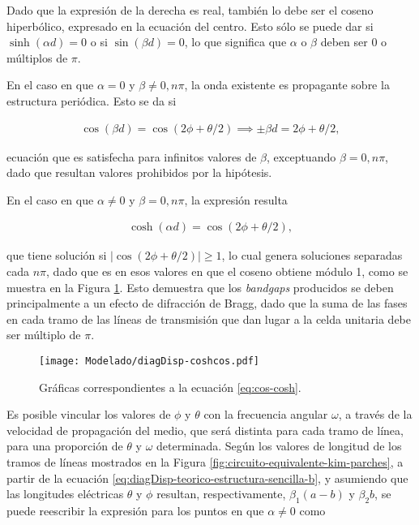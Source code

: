 Dado que la expresión de la derecha es real, también lo debe ser el coseno hiperbólico, expresado en la ecuación del centro. Esto sólo se puede dar si $\sinh(\alpha d) = 0$ o si $\sin(\beta d) = 0$, lo que significa que $\alpha$ o $\beta$ deben ser $0$ o múltiplos de $\pi$.

En el caso en que $\alpha = 0$ y $\beta \neq 0,n\pi$, la onda existente es propagante sobre la estructura periódica. Esto se da si

\begin{align}
	\label{eq:diagDisp-teorico-estructura-sencilla-b}
	\cos(\beta d) = \cos(2\phi + \theta/2) \implies \pm \beta d = 2\phi + \theta/2,
\end{align}

ecuación que es satisfecha para infinitos valores de $\beta$, exceptuando $\beta=0,n\pi$, dado que resultan valores prohibidos por la hipótesis.

En el caso en que $\alpha \neq 0$ y $\beta = 0,n\pi$, la expresión resulta

\begin{align}
\label{eq:cos-cosh}
\cosh(\alpha d) = \cos(2\phi + \theta/2),
\end{align}

que tiene solución si $|\cos(2\phi + \theta/2)| \geq 1$, lo cual genera soluciones separadas cada $n\pi$, dado que es en esos valores en que el coseno obtiene módulo 1, como se muestra en la Figura \ref{fig:solucion-cos-cosh}. Esto demuestra que los \textit{bandgaps} producidos se deben principalmente a un efecto de difracción de Bragg, dado que la suma de las fases en cada tramo de las líneas de transmisión que dan lugar a la celda unitaria debe ser múltiplo de $\pi$.

\begin{figure}[h]
	\centering
	\texttt{[image: Modelado/diagDisp-coshcos.pdf]}
	\caption{Gráficas correspondientes a la ecuación \ref{eq:cos-cosh}.}
	\label{fig:solucion-cos-cosh}
\end{figure}

Es posible vincular los valores de $\phi$ y $\theta$ con la frecuencia angular $\omega$, a través de la velocidad de propagación del medio, que será distinta para cada tramo de línea, para una proporción de $\theta$ y $\omega$ determinada. Según los valores de longitud de los tramos de líneas mostrados en la Figura \ref{fig:circuito-equivalente-kim-parches}, a partir de la ecuación \ref{eq:diagDisp-teorico-estructura-sencilla-b}, y asumiendo que las longitudes eléctricas $\theta$ y $\phi$ resultan, respectivamente, $\beta_1 (a-b)$ y $\beta_2 b$, se puede reescribir la expresión para los puntos en que $\alpha\neq 0$ como


